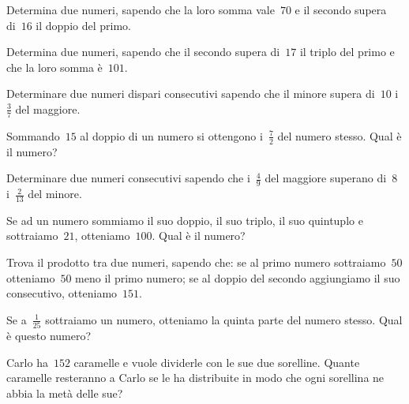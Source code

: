 \begin{multicols}{2}
\begin{esercizio}[\Ast]
Determina due numeri, sapendo che la loro somma vale~$70$ e il secondo supera di~$16$ il doppio del primo.
\end{esercizio}

\begin{esercizio}[\Ast]
Determina due numeri, sapendo che il secondo supera di~$17$ il triplo del primo e che la loro somma è~$101$.
\end{esercizio}

\begin{esercizio}[\Ast]
Determinare due numeri dispari consecutivi sapendo che il minore supera di~$10$ i~$\frac{3}{7}$ del maggiore.
\end{esercizio}

\begin{esercizio}[\Ast]
Sommando~$15$ al doppio di un numero si ottengono i~$\frac{7}{2}$ del numero stesso. Qual è il numero?
\end{esercizio}

\begin{esercizio}
Determinare due numeri consecutivi sapendo che i~$\frac{4}{9}$ del maggiore superano di~$8$ i~$\frac{2}{13}$ del minore.
\end{esercizio}

\begin{esercizio}[\Ast]
Se ad un numero sommiamo il suo doppio, il suo triplo, il suo quintuplo e sottraiamo~$21$, otteniamo~$100$. Qual è il numero?
\end{esercizio}

\begin{esercizio}[\Ast]
Trova il prodotto tra due numeri, sapendo che: se al primo numero sottraiamo~$50$ otteniamo~$50$ meno il primo numero; se al doppio del secondo aggiungiamo il suo consecutivo, otteniamo~$151$.
\end{esercizio}

\begin{esercizio}[\Ast]
Se a~$\frac{1}{25}$ sottraiamo un numero, otteniamo la quinta parte del numero stesso. Qual è questo numero?
\end{esercizio}

\begin{esercizio}[\Ast]
Carlo ha~$152$ caramelle e vuole dividerle con le sue due sorelline. Quante caramelle resteranno a Carlo se le ha distribuite in modo che ogni sorellina ne abbia la metà delle sue?
\end{esercizio}


\end{multicols}
